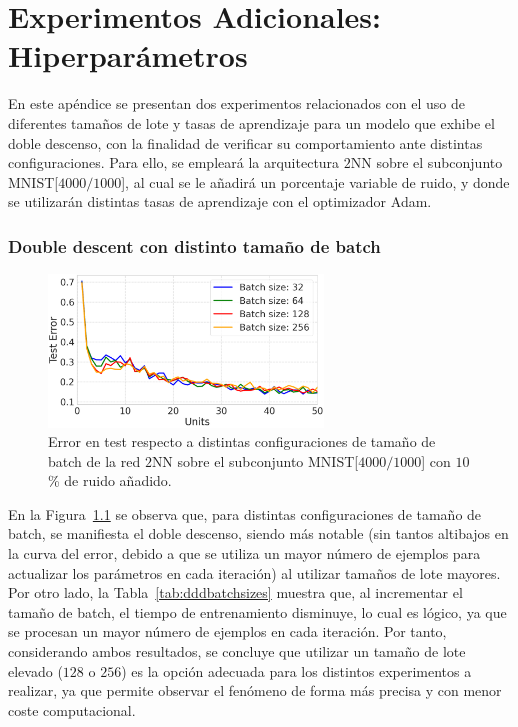 
\chapter{Experimentos Adicionales: Hiperparámetros}\label{ap:apendiceB}

En este apéndice se presentan dos experimentos relacionados con el uso de diferentes tamaños de lote y tasas de aprendizaje para un modelo que exhibe el doble descenso, con la finalidad de verificar su comportamiento ante distintas configuraciones. Para ello, se empleará la arquitectura $2$NN sobre el subconjunto MNIST[$4000/1000$], al cual se le añadirá un porcentaje variable de ruido, y donde se utilizarán distintas tasas de aprendizaje con el optimizador Adam.\newline
 
\subsection*{Double descent con distinto tamaño de batch}

\begin{figure}[h!]
    \centering
    \includegraphics[width=0.65\textwidth]{img/experiments/batch_sizes_ddd.png}
    \caption[Doble descenso para distintos tamaños de lote.]{Error en test respecto a distintas configuraciones de tamaño de batch de la red $2$NN sobre el subconjunto MNIST[$4000/1000$] con $10$\% de ruido añadido.}\label{fig:dddbatchsizes}
\end{figure}

En la Figura~\ref{fig:dddbatchsizes} se observa que, para distintas configuraciones de tamaño de batch, se manifiesta el doble descenso, siendo más notable (sin tantos altibajos en la curva del error, debido a que se utiliza un mayor número de ejemplos para actualizar los parámetros en cada iteración) al utilizar tamaños de lote mayores. Por otro lado, la Tabla~\ref{tab:dddbatchsizes} muestra que, al incrementar el tamaño de batch, el tiempo de entrenamiento disminuye, lo cual es lógico, ya que se procesan un mayor número de ejemplos en cada iteración. Por tanto, considerando ambos resultados, se concluye que utilizar un tamaño de lote elevado ($128$ o $256$) es la opción adecuada para los distintos experimentos a realizar, ya que permite observar el fenómeno de forma más precisa y con menor coste computacional.\newline

